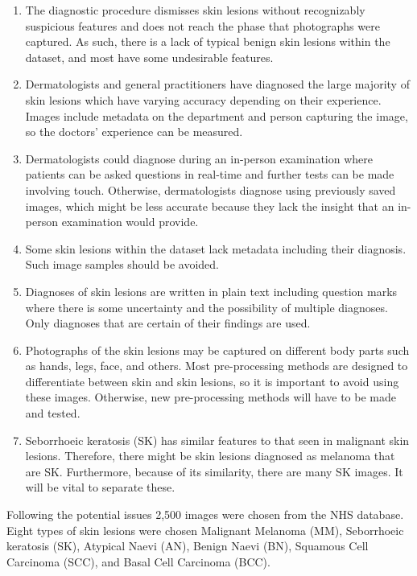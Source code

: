 \begin{enumerate}
    \item The diagnostic procedure dismisses skin lesions without recognizably suspicious features and does not reach the phase that photographs were captured. As such, there is a lack of typical benign skin lesions within the dataset, and most have some undesirable features.
    \item Dermatologists and general practitioners have diagnosed the large majority of skin lesions which have varying accuracy depending on their experience. Images include metadata on the department and person capturing the image, so the doctors' experience can be measured.
    \item Dermatologists could diagnose during an in-person examination where patients can be asked questions in real-time and further tests can be made involving touch. Otherwise, dermatologists diagnose using previously saved images, which might be less accurate because they lack the insight that an in-person examination would provide.
    \item Some skin lesions within the dataset lack metadata including their diagnosis. Such image samples should be avoided.
    \item Diagnoses of skin lesions are written in plain text including question marks where there is some uncertainty and the possibility of multiple diagnoses. Only diagnoses that are certain of their findings are used.
    \item Photographs of the skin lesions may be captured on different body parts such as hands, legs, face, and others. Most pre-processing methods are designed to differentiate between skin and skin lesions, so it is important to avoid using these images. Otherwise, new pre-processing methods will have to be made and tested.
    \item Seborrhoeic keratosis (SK) has similar features to that seen in malignant skin lesions. Therefore, there might be skin lesions diagnosed as melanoma that are SK. Furthermore, because of its similarity, there are many SK images. It will be vital to separate these.
\end{enumerate}

Following the potential issues 2,500 images were chosen from the NHS database. Eight types of skin lesions were chosen Malignant Melanoma (MM), Seborrhoeic keratosis (SK), Atypical Naevi (AN), Benign Naevi (BN), Squamous Cell Carcinoma (SCC), and Basal Cell Carcinoma (BCC).

